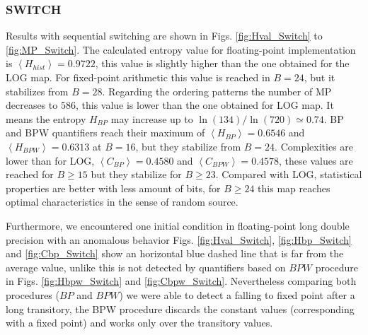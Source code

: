 \subsubsection{SWITCH} \label{sssec:switch}

Results with sequential switching are shown in Figs. \ref{fig:Hval_Switch} to \ref{fig:MP_Switch}.
The calculated entropy value for floating-point implementation is $\left\langle H_{hist}\right\rangle =0.9722$, this value is slightly higher than the one obtained for the LOG map. 
For fixed-point arithmetic this value is reached in $B=24$, but it stabilizes from $B=28$.
Regarding the ordering patterns the number of MP decreases to $586$, this value is lower than the one obtained for LOG map.
It means the entropy $H_{BP}$ may increase up to $\ln(134)/\ln(720)\simeq 0.74$.
BP and BPW quantifiers reach their maximum of $\left\langle H_{BP}\right\rangle =0.6546$ and $\left\langle H_{BPW}\right\rangle =0.6313$ at $B=16$, but they stabilize from $B=24$.
Complexities are lower than for LOG, $\left\langle C_{BP}\right\rangle =0.4580$ and $\left\langle C_{BPW}\right\rangle =0.4578$, these values are reached for $B \geq 15$ but they stabilize for $B \geq 23$.
Compared with LOG, statistical properties are better with less amount of bits, for $B \geq 24$ this map reaches optimal characteristics in the sense of random source.

Furthermore, we encountered one initial condition in floating-point long double precision with an anomalous behavior
Figs. \ref{fig:Hval_Switch}, \ref{fig:Hbp_Switch} and \ref{fig:Cbp_Switch} show an horizontal blue dashed line that is far from the average value, unlike this is not detected by quantifiers based on $BPW$ procedure in Figs. \ref{fig:Hbpw_Switch} and \ref{fig:Cbpw_Switch}.
Nevertheless comparing both procedures ($BP$ and $BPW$) we were able to detect a falling to fixed point after a long transitory, the BPW procedure discards the constant values (corresponding with a fixed point) and works only over the transitory values.

